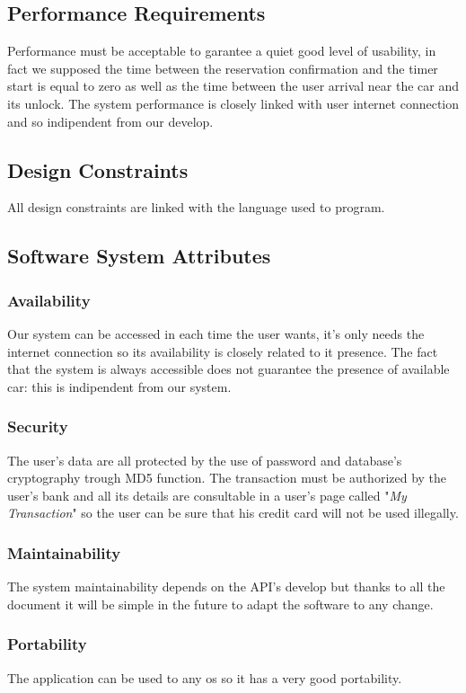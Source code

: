 \subsection{Performance Requirements} \label{sec:perf_requirements}
Performance must be acceptable to garantee a quiet good level of usability, in fact we supposed the time between the reservation confirmation and the timer start is equal to zero as well as the time between the user arrival near the car and its unlock. The system performance is closely linked with user internet connection and so indipendent from our develop.

\subsection{Design Constraints} \label{sec:design_constr}
All design constraints are linked with the language used to program.

\subsection{Software System Attributes} \label{sec:sw_sys_attr}
\subsubsection{Availability} \label{availability}
Our system can be accessed in each time the user wants, it's only needs the internet connection so its availability is closely related to it presence. The fact that the system is always accessible does not guarantee the presence of available car: this is indipendent from our system.

\subsubsection{Security} \label{security}
The user's data are all protected by the use of password and database's cryptography trough MD5 function. The transaction must be authorized by the user's bank and all its details are consultable in a user's page called "\textit{My Transaction}" so the user can be sure that his credit card will not be used illegally.

\subsubsection{Maintainability} \label{maintainability}
The system maintainability depends on the API's develop but thanks to all the document it will be simple in the future to adapt the software to any change.

\subsubsection{Portability} \label{portability}
The application can be used to any \acs{os} so it has a very good portability.

